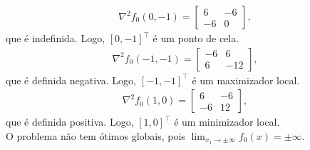 \begin{questions}
\begin{solution}
    \begin{align*}
    	\nabla^2 f_0\left(0, -1\right) = 
        \begin{bmatrix}
    		6   & -6 \\
    		-6  & 0
		\end{bmatrix},
    \end{align*}
    que é indefinida. Logo, $[0, -1]^\top $ é um ponto de cela.
    \begin{align*}
    	\nabla^2 f_0\left( -1, -1 \right) = 
        \begin{bmatrix}
    		-6  &  6 \\
    		 6  & -12
		\end{bmatrix},
    \end{align*}
    que é definida negativa. Logo, $[-1, -1]^\top $ é um maximizador local.
    \begin{align*}
    	\nabla^2 f_0\left( 1, 0\right) = 
        \begin{bmatrix}
    		6  &  -6 \\
    		-6  & 12
		\end{bmatrix},
    \end{align*}
    que é definida positiva. Logo, $[1, 0]^\top $ é um minimizador local.\\
    O problema não tem ótimos globais, pois $\displaystyle\lim_{x_1\to\pm\infty}f_0(x) = \pm\infty$.
\end{solution}


\end{questions}
